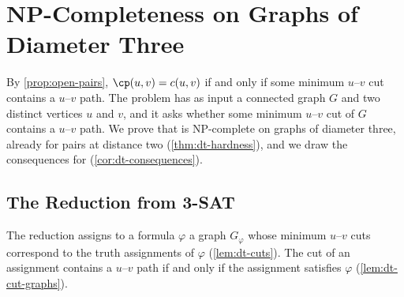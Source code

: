 
\section{NP-Completeness on Graphs of Diameter Three}
\label{sec:dt-diameter-three}

By \cref{prop:open-pairs}, $\cp(u, v) = c(u, v)$ if and only if some minimum $u$--$v$ cut contains a $u$--$v$ path.
The problem \PathInMinCut{} has as input a connected graph $G$ and two distinct vertices $u$ and $v$, and it asks whether some minimum $u$--$v$ cut of $G$ contains a $u$--$v$ path.
We prove that \PathInMinCut{} is NP-complete on graphs of diameter three, already for pairs at distance two (\cref{thm:dt-hardness}), and we draw the consequences for \MinCutPath{} (\cref{cor:dt-consequences}).

\subsection{The Reduction from 3-SAT}
\label{sec:dt-construction}

The reduction assigns to a formula $\varphi$ a graph $G_\varphi$ whose minimum $u$--$v$ cuts correspond to the truth assignments of $\varphi$ (\cref{lem:dt-cuts}).
The cut of an assignment contains a $u$--$v$ path if and only if the assignment satisfies $\varphi$ (\cref{lem:dt-cut-graphs}).

